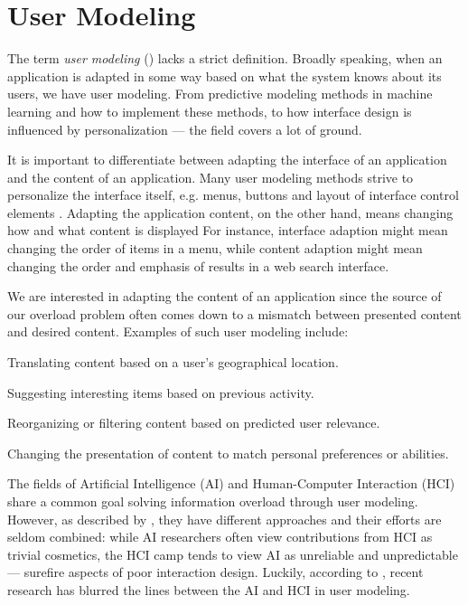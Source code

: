 \section{User Modeling}

The term \emph{user modeling} () lacks a strict definition. 
Broadly speaking, when an application is adapted in some way based on what the system knows about its users, we have user modeling. 
From predictive modeling methods in machine learning and how to implement these methods, 
to how interface design is influenced by personalization --- the field covers a lot of ground. 

It is important to differentiate between adapting the interface of an application and the content of an application. 
Many user modeling methods strive to personalize the interface itself, e.g. menus, buttons and layout of interface control elements 
\citep{Jameson2009, Fischer2001}. 
Adapting the application content, on the other hand, means changing how and what content is displayed
For instance, interface adaption might mean changing the order of items in a menu, while content 
adaption might mean changing the order and emphasis of results in a web search interface.

We are interested in adapting the content of an application since the source of our overload problem often 
comes down to a mismatch between presented content and desired content. Examples of such user modeling include:

\begin{itemize*}
  \item Translating content based on a user's geographical location.
  \item Suggesting interesting items based on previous activity.
  \item Reorganizing or filtering content based on predicted user relevance.
  \item Changing the presentation of content to match personal preferences or abilities.
\end{itemize*}

The fields of Artificial Intelligence (AI) and Human-Computer Interaction (HCI) share a common goal solving information overload through user modeling. 
However, as described by \cite{Lieberman2009}, they have different approaches and their efforts are seldom combined: 
while AI researchers often view contributions from HCI as trivial cosmetics, the HCI camp
tends to view AI as unreliable and unpredictable --- surefire aspects of poor interaction design.
Luckily, according to \cite{Kobsa2001}, recent research has blurred the lines between the AI and HCI in user modeling.

